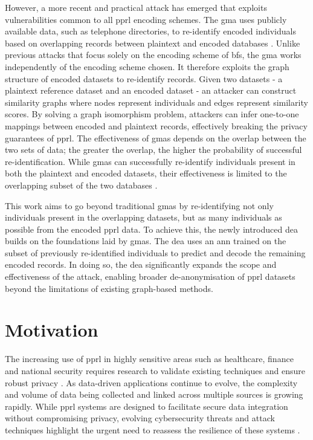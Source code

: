 However, a more recent and practical attack has emerged that exploits vulnerabilities common to all \ac{pprl} encoding schemes.
The \ac{gma} uses publicly available data, such as telephone directories, to re-identify encoded individuals based on overlapping records between plaintext and encoded databases \cite{vidanage2020graph, schaefer2024}.
Unlike previous attacks that focus solely on the encoding scheme of \ac{bf}s, the \ac{gma} works independently of the encoding scheme chosen.
It therefore exploits the graph structure of encoded datasets to re-identify records. Given two datasets - a plaintext reference dataset and an encoded dataset - an attacker can construct similarity graphs where nodes represent individuals and edges represent similarity scores.
By solving a graph isomorphism problem, attackers can infer one-to-one mappings between encoded and plaintext records, effectively breaking the privacy guarantees of \ac{pprl}.
The effectiveness of \ac{gma}s depends on the overlap between the two sets of data; the greater the overlap, the higher the probability of successful re-identification.
While \ac{gma}s can successfully re-identify individuals present in both the plaintext and encoded datasets, their effectiveness is limited to the overlapping subset of the two databases \cite{schaefer2024,vidanage2020graph}.

This work aims to go beyond traditional \ac{gma}s by re-identifying not only individuals present in the overlapping datasets, but as many individuals as possible from the encoded \ac{pprl} data.
To achieve this, the newly introduced \ac{dea} builds on the foundations laid by \ac{gma}s.
The \ac{dea} uses an \ac{ann} trained on the subset of previously re-identified individuals to predict and decode the remaining encoded records.
In doing so, the \ac{dea} significantly expands the scope and effectiveness of the attack, enabling broader de-anonymisation of \ac{pprl} datasets beyond the limitations of existing graph-based methods.

\section{Motivation} \label{sec:motivation}

The increasing use of \ac{pprl} in highly sensitive areas such as healthcare, finance and national security requires research to validate existing techniques and ensure robust privacy \cite{schnell2009privacy}.
As data-driven applications continue to evolve, the complexity and volume of data being collected and linked across multiple sources is growing rapidly.
While \ac{pprl} systems are designed to facilitate secure data integration without compromising privacy, evolving cybersecurity threats and attack techniques highlight the urgent need to reassess the resilience of these systems \cite{vatsalan2017privacy}.

